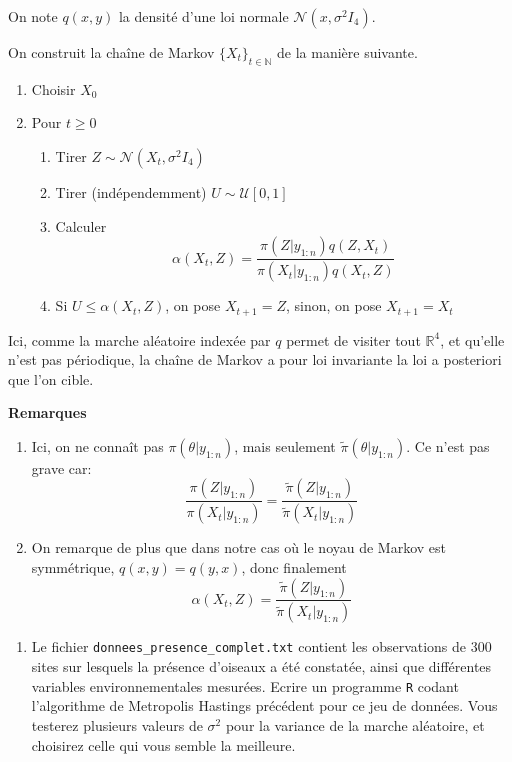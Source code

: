 \documentclass[]{article}
\providecommand{\tightlist}{%
  \setlength{\itemsep}{0pt}\setlength{\parskip}{0pt}}
\newenvironment{Correction}%
  { \vspace{\baselineskip}\begin{mdframed}[backgroundcolor=my_green]}%
  {\end{mdframed}}
\begin{document}
\begin{Correction}
On note $q(x, y)$ la densité d'une loi normale $\mathcal{N}(x, \sigma^2I_4)$.

On construit la chaîne de Markov $\lbrace X_t \rbrace_{t \in \mathbb{N}}$ de la manière suivante.

\begin{enumerate}
\item Choisir $X_0$
\item Pour $t\geq 0$
\begin{enumerate}
\item Tirer $Z \sim \mathcal{N}(X_t, \sigma^2I_4)$
\item Tirer (indépendemment) $U \sim \mathcal{U}[0, 1]$
\item Calculer
$$\alpha(X_t, Z) = \frac{\pi(Z \vert y_{1:n}) q(Z, X_t)}{\pi(X_t \vert y_{1:n}) q(X_t, Z)}$$
\item Si $U \leq \alpha(X_t, Z)$, on pose $X_{t+1} = Z$, sinon, on pose $X_{t+1} = X_t$
\end{enumerate}
\end{enumerate}

Ici, comme la marche aléatoire indexée par $q$ permet de visiter tout $\mathbb{R}^4$, et qu'elle n'est pas périodique, la chaîne de Markov a pour loi invariante la loi a posteriori que l'on cible.

\textbf{Remarques} 
\begin{enumerate}
\item Ici, on ne connaît pas $\pi(\theta\vert {y_{1:n}})$, mais seulement $\tilde{\pi}(\theta\vert {y_{1:n}})$. Ce n'est pas grave car:
$$\frac{\pi(Z \vert y_{1:n})}{\pi(X_t \vert y_{1:n})} = \frac{\tilde{\pi}(Z \vert y_{1:n})}{\tilde{\pi}(X_t \vert y_{1:n})}$$
\item On remarque de plus que dans notre cas où le noyau de Markov est symmétrique, $q(x, y) = q(y,x)$, donc finalement
$$\alpha(X_t, Z)= \frac{\tilde{\pi}(Z \vert y_{1:n})}{\tilde{\pi}(X_t \vert y_{1:n})}$$
\end{enumerate}

\end{Correction}

\begin{enumerate}
\def\labelenumi{\arabic{enumi}.}
\setcounter{enumi}{2}
\tightlist
\item
  Le fichier \texttt{donnees\_presence\_complet.txt} contient les
  observations de 300 sites sur lesquels la présence d'oiseaux a été
  constatée, ainsi que différentes variables environnementales mesurées.
  Ecrire un programme \texttt{R} codant l'algorithme de Metropolis
  Hastings précédent pour ce jeu de données. Vous testerez plusieurs
  valeurs de \(\sigma^2\) pour la variance de la marche aléatoire, et
  choisirez celle qui vous semble la meilleure.
\end{enumerate}
\end{document}
